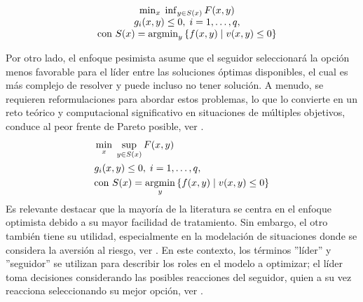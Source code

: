     \begin{equation}  \label{eq:EnfoqueOptimistaGeneral}
    \begin{matrix}
    & \min_{x} \; \inf_{y \in S(x)} F(x, y) \\& g_i(x, y)\leq 0,\;i=1,\ldots,q, \\
    & \text{con } S(x) = \operatorname*{argmin}_{y} \left\{ f(x, y) \mid v(x, y) \leq 0 \right\}
    \end{matrix}
    \end{equation}

Por otro lado, el enfoque pesimista asume que el seguidor seleccionará la opción menos favorable para el líder entre las soluciones óptimas disponibles, el cual es más complejo de resolver y puede incluso no tener solución. A menudo, se requieren reformulaciones para abordar estos problemas, lo que lo convierte en un reto teórico y computacional significativo en situaciones de múltiples objetivos, conduce al peor frente de Pareto posible, ver \cite{Sinha2017ARO}.
\begin{equation}
\begin{aligned}
    & \min_{x} \; \sup_{y \in S(x)} F(x, y) \\& g_i(x, y)\leq 0,\;i=1,\ldots,q, \\
& \text{con } S(x) = \operatorname*{argmin}_{y} \left\{ f(x, y) \mid v(x, y) \leq 0 \right\}
\end{aligned}
\label{eq:EnfoquePesimistaGeneral}
\end{equation}
Es relevante destacar que la mayoría de la literatura se centra en el enfoque optimista debido a su mayor facilidad de tratamiento. Sin embargo, el otro también tiene su utilidad, especialmente en la modelación de situaciones donde se considera la aversión al riesgo, ver \cite{DempeyZemkoho2020}. En este contexto, los términos ''líder'' y ''seguidor'' se utilizan para describir los roles en el modelo a optimizar; el líder toma decisiones considerando las posibles reacciones del seguidor, quien a su vez reacciona seleccionando su mejor opción, ver \cite{Sinha2017ARO}.

